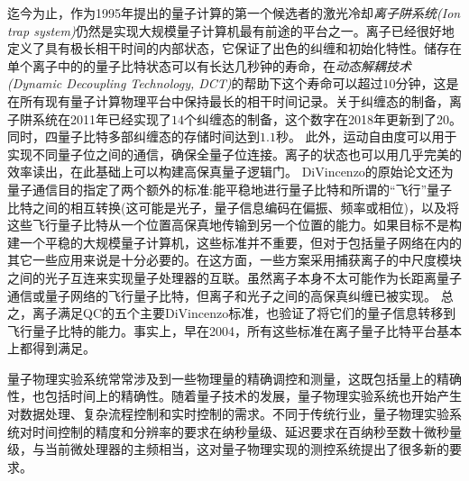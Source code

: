 迄今为止，作为1995年提出的量子计算的第一个候选者的激光冷却\emph{离子阱系统(Ion trap system)}仍然是实现大规模量子计算机最有前途的平台之一。离子已经很好地定义了具有极长相干时间\cite[]{Fisk_Sellars_Lawn_Coles_1997}的内部状态，它保证了出色的纠缠和初始化特性\cite[]{Blatt_Wineland_2008}。储存在单个离子中的的量子比特状态可以有长达几秒钟的寿命\cite[]{Langer_Ozeri_Jost_Chiaverini_DeMarco_Ben_Kish_Blakestad_Britton_Hume_Itano_et_al_2005}，在\emph{动态解耦技术(Dynamic Decoupling Technology, DCT)}的帮助下这个寿命可以超过$10$分钟\cite[]{Wang_Um_Zhang_An_Lyu_Zhang_Duan_Yum_Kim_2017}，这是在所有现有量子计算物理平台中保持最长的相干时间记录。关于纠缠态的制备，离子阱系统在2011年已经实现了$14$个纠缠态的制备\cite[]{Monz_Schindler_Barreiro_Chwalla_Nigg_Coish_Harlander_Hänsel_Hennrich_Blatt_2011}，这个数字在2018年更新到了20\cite[]{Friis_Marty_Maier_Hempel_Holzäpfel_Jurcevic_Plenio_Huber_Roos_Blatt_et_al_2018}。同时，四量子比特多部纠缠态的存储时间达到$1.1$秒\cite[]{Kaufmann_Ruster_Schmiegelow_Luda_Kaushal_Schulz_von_Lindenfels_Schmidt_Kaler_Poschinger_2017}。
此外，运动自由度可以用于实现不同量子位之间的通信，确保全量子位连接\cite[]{Debnath_Linke_Figgatt_Landsman_Wright_Monroe_2016}。离子的状态也可以用几乎完美的效率读出\cite[]{Myerson_Szwer_Webster_Allcock_Curtis_Imreh_Sherman_Stacey_Steane_Lucas_2008}，在此基础上可以构建高保真量子逻辑门\cite[]{Ballance_Harty_Linke_Sepiol_Lucas_2016}。
DiVincenzo的原始论文还为量子通信目的指定了两个额外的标准:能平稳地进行量子比特和所谓的“飞行”量子比特之间的相互转换(这可能是光子，量子信息编码在偏振、频率或相位)，以及将这些飞行量子比特从一个位置高保真地传输到另一个位置的能力。如果目标不是构建一个平稳的大规模量子计算机，这些标准并不重要，但对于包括量子网络在内的其它一些应用来说是十分必要的。在这方面，一些方案采用捕获离子的中尺度模块之间的光子互连来实现量子处理器的互联\cite[]{Monroe_Raussendorf_Ruthven_Brown_Maunz_Duan_Kim_2014}。虽然离子本身不太可能作为长距离量子通信或量子网络的飞行量子比特，但离子和光子之间的高保真纠缠已被实现\cite[]{Moehring_Blinov_Madsen_Duan_Monroe_2004}。
总之，离子满足QC的五个主要DiVincenzo标准，也验证了将它们的量子信息转移到飞行量子比特的能力。事实上，早在2004，所有这些标准在离子量子比特平台基本上都得到满足\cite[]{Leibfried_DeMarco_Meyer_Lucas_Barrett_Britton_Itano_Jelenković_Langer_Rosenband_et_al_2003,Moehring_Blinov_Madsen_Duan_Monroe_2004}。

量子物理实验系统常常涉及到一些物理量的精确调控和测量，这既包括量上的精确性，也包括时间上的精确性。随着量子技术的发展，量子物理实验系统也开始产生对数据处理、复杂流程控制和实时控制的需求。不同于传统行业，量子物理实验系统对时间控制的精度和分辨率的要求在纳秒量级、延迟要求在百纳秒至数十微秒量级，与当前微处理器的主频相当，这对量子物理实现的测控系统提出了很多新的要求。

